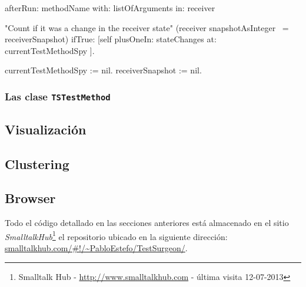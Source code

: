 \begin{codeWithLineNumbers}
afterRun: methodName with: listOfArguments in: receiver

	"Count if it was a change in the receiver state"
	(receiver snapshotAsInteger ~= receiverSnapshot) ifTrue: [self plusOneIn: stateChanges at: currentTestMethodSpy ]. 

	currentTestMethodSpy := nil.
	receiverSnapshot := nil.

\end{codeWithLineNumbers}\label{code:after-run} 

\subsubsection{Las clase {\tt TSTestMethod} }

\subsection{Visualización}

\subsection{Clustering}

\subsection{Browser}


\par Todo el código detallado en las secciones anteriores está almacenado en el sitio \emph{SmalltalkHub}\footnote{Smalltalk Hub - \url{http://www.smalltalkhub.com} - última visita 12-07-2013 } el repositorio ubicado en la siguiente dirección: \url{smalltalkhub.com/#!/~PabloEstefo/TestSurgeon/}. 